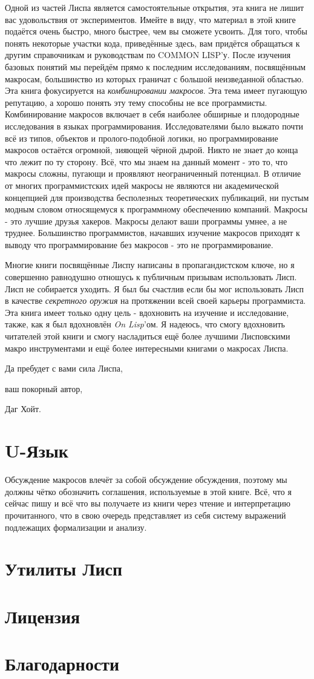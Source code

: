 Одной из частей Лиспа является самостоятельные открытия, эта книга не лишит вас удовольствия от экспериментов. Имейте в виду, что материал в этой книге подаётся очень быстро, много быстрее, чем вы сможете усвоить. Для того, чтобы понять некоторые участки кода, приведённые здесь, вам придётся обращаться к другим справочникам и руководствам по COMMON LISP'у. После изучения базовых понятий мы перейдём прямо к последним исследованиям, посвящённым макросам, большинство из которых граничат с большой неизведанной областью. Эта книга фокусируется на \emph{комбинировании макросов}. Эта тема имеет пугающую репутацию, а хорошо понять эту тему способны не все программисты. Комбинирование макросов включает в себя наиболее обширные и плодородные исследования в языках программирования. Исследователями было выжато почти всё из типов, объектов и пролого-подобной логики, но программирование макросов остаётся огромной, зияющей чёрной дырой. Никто не знает до конца что лежит по ту сторону. Всё, что мы знаем на данный момент - это то, что макросы сложны, пугающи и проявляют неограниченный потенциал. В отличие от многих программистских идей макросы не являются ни академической концепцией для производства бесполезных теоретических публикаций, ни пустым модным словом относящемуся к программному обеспечению компаний. Макросы - это лучшие друзья хакеров. Макросы делают ваши программы умнее, а не труднее. Большинство программистов, начавших изучение макросов приходят к выводу что программирование без макросов - это не программирование.

Многие книги посвящённые Лиспу написаны в пропагандистском ключе, но я совершенно равнодушно отношусь к публичным призывам использовать Лисп. Лисп не собирается уходить. Я был бы счастлив если бы мог использовать Лисп в качестве \emph{секретного оружия} на протяжении всей своей карьеры программиста. Эта книга имеет только одну цель - вдохновить на изучение и исследование, также, как я был вдохновлён \emph{On Lisp}'ом. Я надеюсь, что смогу вдохновить читателей этой книги и смогу насладиться ещё более лучшими Лисповскими макро инструментами и ещё более интересными книгами о макросах Лиспа.

Да пребудет с вами сила Лиспа,

ваш покорный автор,

Даг Хойт.
\section{U-Язык}\label{section_u_language}
Обсуждение макросов влечёт за собой обсуждение обсуждения, поэтому мы должны чётко обозначить соглашения, используемые в этой книге. Всё, что я сейчас пишу и всё что вы получаете из книги через чтение и интерпретацию прочитанного, что в свою очередь представляет из себя систему выражений подлежащих формализации и анализу.

\section{Утилиты Лисп}\label{section_the_lisp_utility}
\section{Лицензия}\label{section_license}
\section{Благодарности}\label{section_thanks}
